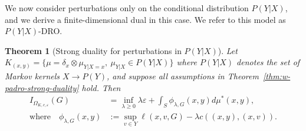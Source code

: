 \documentclass{article}
\newcommand{\Okc}{\Omega_{K, c, \varepsilon}}
\newcommand{\phifix}{\phi_{\lambda, G}}
\newtheorem{theorem}{Theorem}[section]
\theoremstyle{definition}
\theoremstyle{remarksty}
\newtheorem{remark}{Remark}[section]
\newenvironment{remark*}
  {\pushQED{\hfill$\lozenge$}\begin{remark}}
  {\popQED\end{remark}}
\begin{document}

We now consider perturbations only on the conditional distribution $P(Y|X)$, and we derive a finite-dimensional dual in this case. We refer to this model as $P(Y|X)$-DRO.

\begin{theorem}[Strong duality for perturbations in $P(Y|X)$]\label{th:k=Y|X}
Let $K_{(x,y)}=\{\mu=\delta_x \otimes \mu_{Y|X=x},\ \mu_{Y|X} \in P(Y|X) \}$ where $P(Y|X)$ denotes the set of Markov kernels $X \to P(Y)$, and suppose all assumptions in Theorem~\ref{thm:w-padro-strong-duality} hold. Then
    \begin{align*}
        I_{\Okc} (G) &= \inf_{\lambda \geq 0} \lambda \varepsilon + \int_{S} \phifix(x,y) d\mu^*(x,y), \\
        \text{where} \quad \phifix (x,y) &:=\sup_{v \in Y}\ell (x, v, G) - \lambda c((x,y),(x,v)).
    \end{align*}
\end{theorem}
\end{document}
